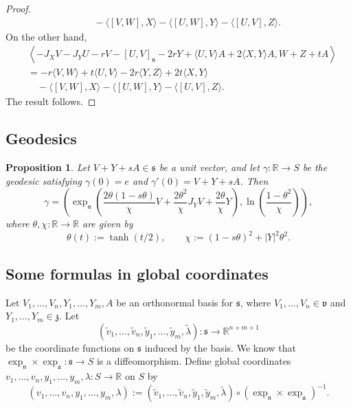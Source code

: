 \documentclass{amsart}
\newcommand{\R}{\mathbb R}
\newcommand{\s}{\mathfrak s}
\renewcommand{\v}{\mathfrak v}
\newcommand{\z}{\mathfrak z}
\newcommand{\n}{\mathfrak n}
\renewcommand{\a}{\mathfrak a}
\theoremstyle{plain}
\newtheorem{proposition}[theorem]{Proposition}
\theoremstyle{definition}
\theoremstyle{remark}
\begin{document}
\begin{proof}
\begin{align*}
 			&\quad-\langle [V,W],X \rangle  - \langle[U,W],Y \rangle  - \langle [U,V],Z \rangle.
 		\end{align*}
 		On  the other hand, 
 		\begin{align*}
 			&\left\langle -J_X V  -J_Y U -  rV - [U,V]_\n -2rY + \langle U,V \rangle A + 2\langle X,Y \rangle A,W+Z+tA\right\rangle \\
 			&=-r\langle V,W \rangle + t \langle U,V \rangle -2r \langle Y,Z \rangle + 2t \langle X,Y \rangle \\
 			&\quad-\langle [V,W],X \rangle  - \langle[U,W],Y \rangle  - \langle [U,V],Z \rangle.
 		\end{align*}
 		The result follows.
 	\end{proof}
 	
 	\subsection{Geodesics}
 
 	\begin{proposition}
 		\label{geodesics}
 		Let $V+Y+ sA \in \s$ be a unit vector, and let $\gamma:\R \rightarrow S$ be the geodesic satisfying $\gamma(0) = e$ and $\gamma'(0) = V+ Y+ sA$. Then 
 		$$\gamma = \left( \exp_\n\left(\frac{2\theta(1-s\theta)}{\chi}V + \frac{2\theta^2}{\chi} J_Y V + \frac{2\theta}{\chi} Y\right), \ln\left(\frac{1-\theta^2}{\chi}\right)\right),$$
 		where $\theta,\chi:\R \rightarrow \R$ are given by 
 		$$\theta(t) := \tanh(t/2), \qquad \chi := (1-s\theta)^2 + |Y|^2 \theta^2.$$
 	\end{proposition}
 
 

 	
 	\subsection{Some formulas in global coordinates} 
 	Let $V_1,\ldots,V_n,Y_1,\ldots,Y_m,A$ be an orthonormal basis for $\s$, where $V_1,\ldots,V_n \in \v$ and $Y_1,\ldots,Y_m \in \z$. Let 
 	$$(\widetilde v_1,\ldots, \widetilde v_n,\widetilde y_1,\ldots,\widetilde y_m,\widetilde \lambda):\s \rightarrow \R^{n+m+1}$$ 
 	be the coordinate functions on $\s$ induced by the basis. 
 	We know that $\exp_{\n} \times \exp_{\a}:\s \rightarrow S$ is a diffeomorphism. Define global coordinates $v_1,\ldots,v_n,y_1,\ldots,y_m,\lambda:S \rightarrow \R$ on $S$ by 
 	$$(v_1,\ldots,v_n,y_1,\ldots,y_m,\lambda) := (\widetilde v_1,\ldots, \widetilde v_n,\widetilde y_1,\widetilde y_m,\widetilde \lambda) \circ (\exp_{\n} \times \exp_{\a})^{-1}.$$
 	
\end{document}
